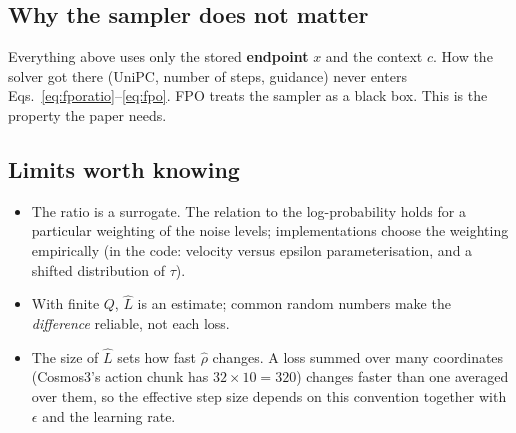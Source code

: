 \documentclass[11pt,a4paper]{article}
\newcommand{\Lh}{\hat L}
\begin{document}
\subsection{Why the sampler does not matter}
Everything above uses only the stored \textbf{endpoint} $x$ and the context $c$. How the solver got there (UniPC, number of steps, guidance) never enters Eqs.~\eqref{eq:fporatio}--\eqref{eq:fpo}. FPO treats the sampler as a black box. This is the property the paper needs.

\subsection{Limits worth knowing}
\begin{itemize}
\item The ratio is a surrogate. The relation to the log-probability holds for a particular weighting of the noise levels; implementations choose the weighting empirically (in the code: velocity versus epsilon parameterisation, and a shifted distribution of $\tau$).
\item With finite $Q$, $\Lh$ is an estimate; common random numbers make the \emph{difference} reliable, not each loss.
\item The size of $\Lh$ sets how fast $\hat\rho$ changes. A loss summed over many coordinates (Cosmos3's action chunk has $32\times10=320$) changes faster than one averaged over them, so the effective step size depends on this convention together with $\epsilon$ and the learning rate.
\end{itemize}


\end{document}
